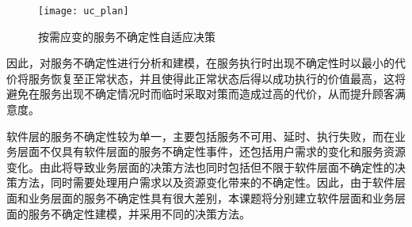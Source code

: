 \begin{figure}[htbp]
\centering
\texttt{[image: uc\_plan]}
\caption{按需应变的服务不确定性自适应决策}\label{uc_plan}
\vspace{-1em}
\end{figure}


因此，对服务不确定性进行分析和建模，在服务执行时出现不确定性时以最小的代价将服务恢复至正常状态，并且使得此正常状态后得以成功执行的价值最高，这将避免在服务出现不确定情况时而临时采取对策而造成过高的代价，从而提升顾客满意度。

软件层的服务不确定性较为单一，主要包括服务不可用、延时、执行失败，而在业务层面不仅具有软件层面的服务不确定性事件，还包括用户需求的变化和服务资源变化。由此将导致业务层面的决策方法也同时包括但不限于软件层面不确定性的决策方法，同时需要处理用户需求以及资源变化带来的不确定性。因此，由于软件层面和业务层面的服务不确定性具有很大差别，本课题将分别建立软件层面和业务层面的服务不确定性建模，并采用不同的决策方法。

